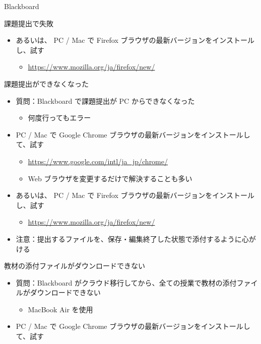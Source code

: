 \documentclass[a4j,10pt]{jsarticle}
\begin{document}
{\begin{frame}[label={sec:orgc119bb0},fragile]{Blackboard}
\begin{block}{課題提出で失敗}
\begin{itemize}
\par
\item あるいは、 PC / Mac で Firefox ブラウザの最新バージョンをインストールし、試す
\begin{itemize}
\item \url{https://www.mozilla.org/ja/firefox/new/}
\end{itemize}
\end{itemize}
\end{block}
\par
\begin{block}{課題提出ができなくなった}
\begin{itemize}
\item 質問：Blackboard で課題提出が PC からできなくなった
\begin{itemize}
\item 何度行ってもエラー
\end{itemize}
\par
\item PC / Mac で Google Chrome ブラウザの最新バージョンをインストールして、試す
\begin{itemize}
\item \url{https://www.google.com/intl/ja\_jp/chrome/}
\item Web ブラウザを変更するだけで解決することも多い
\end{itemize}
\par
\item あるいは、 PC / Mac で Firefox ブラウザの最新バージョンをインストールし、試す
\begin{itemize}
\item \url{https://www.mozilla.org/ja/firefox/new/}
\end{itemize}
\par
\item 注意：提出するファイルを、保存・編集終了した状態で添付するように心がける
\end{itemize}
\end{block}
\par
\begin{block}{教材の添付ファイルがダウンロードできない}
\begin{itemize}
\item 質問：Blackboard がクラウド移行してから、全ての授業で教材の添付ファイルがダウンロードできない
\begin{itemize}
\item MacBook Air を使用
\end{itemize}
\par
\item PC / Mac で Google Chrome ブラウザの最新バージョンをインストールして、試す

\end{itemize}
\end{block}
\end{frame}}
\end{document}
